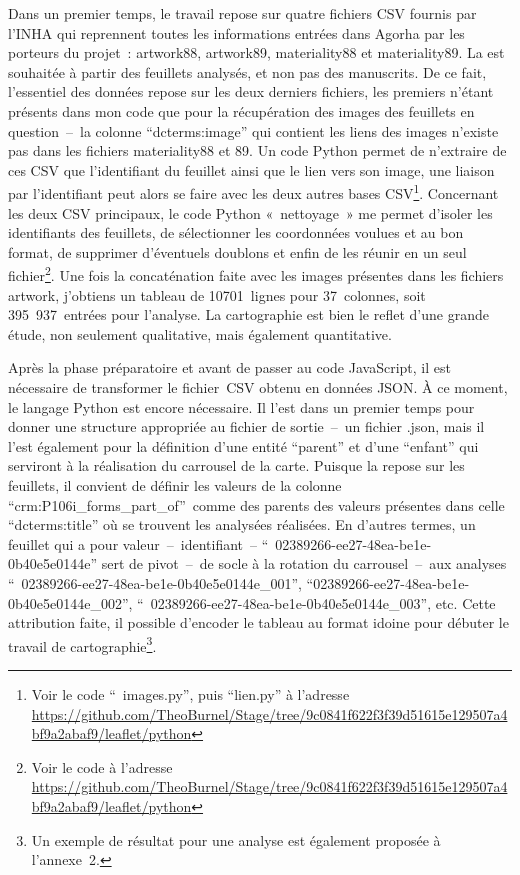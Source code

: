 Dans un premier temps, le travail repose sur quatre fichiers CSV fournis par l’INHA qui reprennent toutes les informations entrées dans Agorha par les porteurs du projet~: artwork88, artwork89, materiality88 et materiality89. La  est souhaitée à partir des feuillets analysés, et non pas des manuscrits. De ce fait, l’essentiel des données repose sur les deux derniers fichiers, les premiers n’étant présents dans mon code que pour la récupération des images des feuillets en question~–~la colonne \enquote{dcterms:image} qui contient les liens des images n’existe pas dans les fichiers materiality88 et 89. Un code Python permet de n’extraire de ces CSV que l’identifiant du feuillet ainsi que le lien vers son image, une liaison par l’identifiant peut alors se faire avec les deux autres bases CSV\footnote{Voir le code \enquote{ images.py}, puis \enquote{lien.py} à l’adresse \url{https://github.com/TheoBurnel/Stage/tree/9c0841f622f3f39d51615e129507a4bf9a2abaf9/leaflet/python}}. Concernant les deux CSV principaux, le code Python « nettoyage » me permet d’isoler les identifiants des feuillets, de sélectionner les coordonnées voulues et au bon format, de supprimer d’éventuels doublons et enfin de les réunir en un seul fichier\footnote{Voir le code à l’adresse \url{https://github.com/TheoBurnel/Stage/tree/9c0841f622f3f39d51615e129507a4bf9a2abaf9/leaflet/python}}. Une fois la concaténation faite avec les images présentes dans les fichiers artwork, j’obtiens un tableau de 10701~lignes pour 37~colonnes, soit 395~937~entrées pour l’analyse. La cartographie est bien le reflet d’une grande étude, non seulement qualitative, mais également quantitative.\par
Après la phase préparatoire et avant de passer au code JavaScript, il est nécessaire de transformer le fichier~CSV obtenu en données JSON. À ce moment, le langage Python est encore nécessaire. Il l’est dans un premier temps pour donner une structure appropriée au fichier de sortie~–~un fichier .json, mais il l’est également pour la définition d’une entité \enquote{parent} et d’une \enquote{enfant} qui serviront à la réalisation du carrousel de la carte. Puisque la  repose sur les feuillets, il convient de définir les valeurs de la colonne \enquote{crm:P106i\_forms\_part\_of} comme des parents des valeurs présentes dans celle \enquote{dcterms:title} où se trouvent les analysées réalisées. En d’autres termes, un feuillet qui a pour valeur~–~identifiant~– \enquote{ 02389266-ee27-48ea-be1e-0b40e5e0144e} sert de pivot~–~de socle à la rotation du carrousel~–~aux analyses \enquote{ 02389266-ee27-48ea-be1e-0b40e5e0144e\_001}, \enquote{02389266-ee27-48ea-be1e-0b40e5e0144e\_002}, \enquote{ 02389266-ee27-48ea-be1e-0b40e5e0144e\_003}, etc. Cette attribution faite, il possible d’encoder le tableau au format idoine pour débuter le travail de cartographie\footnote{Un exemple de résultat pour une analyse est également proposée à l’annexe~2.}.\newpage

